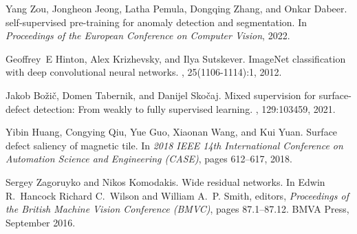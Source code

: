 {\begin{thebibliography}{10}
Yang Zou, Jongheon Jeong, Latha Pemula, Dongqing Zhang, and Onkar Dabeer.
 self-supervised pre-training for anomaly
  detection and segmentation.
\newblock In {\em Proceedings of the European Conference on Computer Vision},
  2022.

Geoffrey~E Hinton, Alex Krizhevsky, and Ilya Sutskever.
\newblock Image{N}et classification with deep convolutional neural networks.
,
  25(1106-1114):1, 2012.

Jakob Bo{\v{z}}i{\v{c}}, Domen Tabernik, and Danijel Sko{\v{c}}aj.
\newblock Mixed supervision for surface-defect detection: From weakly to fully
  supervised learning.
, 129:103459, 2021.

Yibin Huang, Congying Qiu, Yue Guo, Xiaonan Wang, and Kui Yuan.
\newblock Surface defect saliency of magnetic tile.
\newblock In {\em 2018 IEEE 14th International Conference on Automation Science
  and Engineering (CASE)}, pages 612--617, 2018.

Sergey Zagoruyko and Nikos Komodakis.
\newblock Wide residual networks.
\newblock In Edwin R.~Hancock Richard C.~Wilson and William A.~P. Smith,
  editors, {\em Proceedings of the British Machine Vision Conference (BMVC)},
  pages 87.1--87.12. BMVA Press, September 2016.

\end{thebibliography}
}

